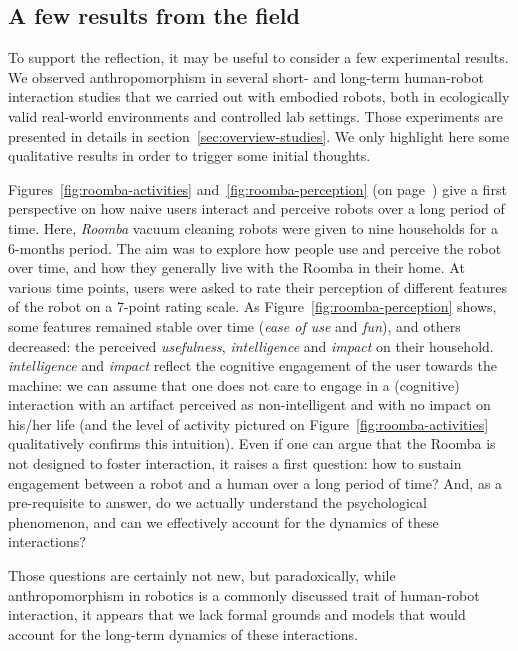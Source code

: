 \documentclass{frontiersSCNS} %
\begin{document}
\subsection{A few results from the field}

To support the reflection, it may be useful to consider a few experimental
results. We observed anthropomorphism in several short- and long-term human-robot
interaction studies that we carried out with embodied robots, both in
ecologically valid real-world environments and controlled lab settings. Those
experiments are presented in details in section~\ref{sec:overview-studies}. We
only highlight here some qualitative results in order to trigger some initial
thoughts.

Figures~\ref{fig:roomba-activities} and~\ref{fig:roomba-perception} (on
page~\pageref{fig:roomba-perception}) give a first perspective on how naive
users interact and perceive robots over a long period of time. Here,
\emph{Roomba} vacuum cleaning robots were given to nine households for a
6-months period. The aim was to explore how people use and perceive the robot
over time, and how they generally live with the Roomba in their home. At various
time points, users were asked to rate their perception of different features of
the robot on a 7-point rating scale. As Figure~\ref{fig:roomba-perception}
shows, some features remained stable over time (\emph{ease of use} and
\emph{fun}), and others decreased: the perceived \emph{usefulness},
\emph{intelligence} and \emph{impact} on their household.  \emph{intelligence}
and \emph{impact} reflect the cognitive engagement of the user towards the
machine: we can assume that one does not care to engage in a (cognitive)
interaction with an artifact perceived as non-intelligent and with no impact on
his/her life (and the level of activity pictured on
Figure~\ref{fig:roomba-activities} qualitatively confirms this intuition). Even
if one can argue that the Roomba is not designed to foster interaction, it
raises a first question: how to sustain engagement between a robot and a human
over a long period of time? And, as a pre-requisite to answer, do we actually
understand the psychological phenomenon, and can we effectively account for the
dynamics of these interactions?

Those questions are certainly not new, but paradoxically, while anthropomorphism
in robotics is a commonly discussed trait of human-robot interaction, it appears
that we lack formal grounds and models that would account for the long-term
dynamics of these interactions.
\end{document}

